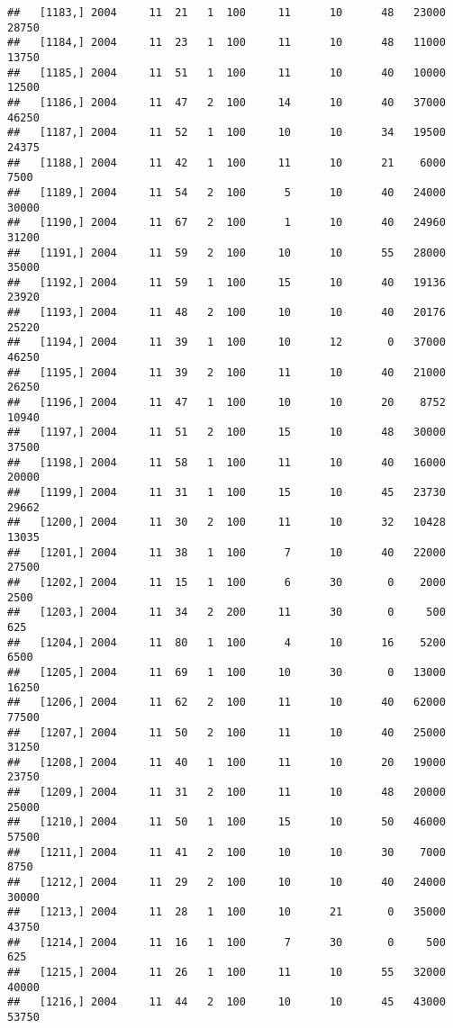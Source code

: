 \documentclass{article}\usepackage[]{graphicx}\usepackage[]{color}
\makeatletter
\newenvironment{kframe}{%
 \def\at@end@of@kframe{}%
 \ifinner\ifhmode%
  \def\at@end@of@kframe{\end{minipage}}%
  \begin{minipage}{\columnwidth}%
 \fi\fi%
 \def\FrameCommand##1{\hskip\@totalleftmargin \hskip-\fboxsep
 \colorbox{shadecolor}{##1}\hskip-\fboxsep
     \hskip-\linewidth \hskip-\@totalleftmargin \hskip\columnwidth}%
 \MakeFramed {\advance\hsize-\width
   \@totalleftmargin\z@ \linewidth\hsize
   \@setminipage}}%
 {\par\unskip\endMakeFramed%
 \at@end@of@kframe}
\newenvironment{knitrout}{}{} %
\makeatother
\begin{document}
\begin{knitrout}
\begin{kframe}
\begin{verbatim}
##   [1183,] 2004     11  21   1  100     11      10      48   23000   28750
##   [1184,] 2004     11  23   1  100     11      10      48   11000   13750
##   [1185,] 2004     11  51   1  100     11      10      40   10000   12500
##   [1186,] 2004     11  47   2  100     14      10      40   37000   46250
##   [1187,] 2004     11  52   1  100     10      10      34   19500   24375
##   [1188,] 2004     11  42   1  100     11      10      21    6000    7500
##   [1189,] 2004     11  54   2  100      5      10      40   24000   30000
##   [1190,] 2004     11  67   2  100      1      10      40   24960   31200
##   [1191,] 2004     11  59   2  100     10      10      55   28000   35000
##   [1192,] 2004     11  59   1  100     15      10      40   19136   23920
##   [1193,] 2004     11  48   2  100     10      10      40   20176   25220
##   [1194,] 2004     11  39   1  100     10      12       0   37000   46250
##   [1195,] 2004     11  39   2  100     11      10      40   21000   26250
##   [1196,] 2004     11  47   1  100     10      10      20    8752   10940
##   [1197,] 2004     11  51   2  100     15      10      48   30000   37500
##   [1198,] 2004     11  58   1  100     11      10      40   16000   20000
##   [1199,] 2004     11  31   1  100     15      10      45   23730   29662
##   [1200,] 2004     11  30   2  100     11      10      32   10428   13035
##   [1201,] 2004     11  38   1  100      7      10      40   22000   27500
##   [1202,] 2004     11  15   1  100      6      30       0    2000    2500
##   [1203,] 2004     11  34   2  200     11      30       0     500     625
##   [1204,] 2004     11  80   1  100      4      10      16    5200    6500
##   [1205,] 2004     11  69   1  100     10      30       0   13000   16250
##   [1206,] 2004     11  62   2  100     11      10      40   62000   77500
##   [1207,] 2004     11  50   2  100     11      10      40   25000   31250
##   [1208,] 2004     11  40   1  100     11      10      20   19000   23750
##   [1209,] 2004     11  31   2  100     11      10      48   20000   25000
##   [1210,] 2004     11  50   1  100     15      10      50   46000   57500
##   [1211,] 2004     11  41   2  100     10      10      30    7000    8750
##   [1212,] 2004     11  29   2  100     10      10      40   24000   30000
##   [1213,] 2004     11  28   1  100     10      21       0   35000   43750
##   [1214,] 2004     11  16   1  100      7      30       0     500     625
##   [1215,] 2004     11  26   1  100     11      10      55   32000   40000
##   [1216,] 2004     11  44   2  100     10      10      45   43000   53750

\end{verbatim}
\end{kframe}
\end{knitrout}
\end{document}
